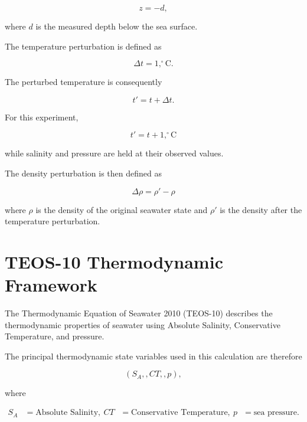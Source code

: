 \documentclass[11pt]{article}
\begin{document}
\begin{equation}
z=-d,
\end{equation}

where $d$ is the measured depth below the sea surface.

The temperature perturbation is defined as

\begin{equation}
\Delta t = 1,^\circ\mathrm{C}.
\end{equation}

The perturbed temperature is consequently

\begin{equation}
t' = t+\Delta t.
\end{equation}

For this experiment,

\begin{equation}
\boxed{
t'=t+1,^\circ\mathrm{C}
}
\end{equation}

while salinity and pressure are held at their observed values.

The density perturbation is then defined as

\begin{equation}
\boxed{
\Delta\rho=\rho'-\rho
}
\end{equation}

where $\rho$ is the density of the original seawater state and
$\rho'$ is the density after the temperature perturbation.

\section{TEOS-10 Thermodynamic Framework}

The Thermodynamic Equation of Seawater 2010 (TEOS-10) describes the
thermodynamic properties of seawater using Absolute Salinity,
Conservative Temperature, and pressure.

The principal thermodynamic state variables used in this calculation
are therefore

\begin{equation}
\left(S_A,,CT,,p\right),
\end{equation}

where

\begin{align}
S_A &= \text{Absolute Salinity},\
CT &= \text{Conservative Temperature},\
p &= \text{sea pressure}.
\end{align}
\end{document}
